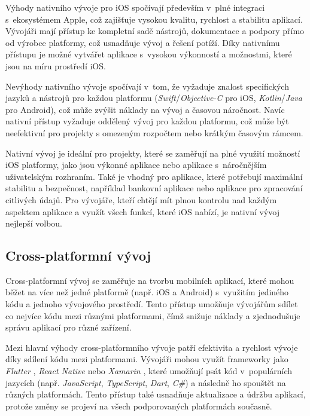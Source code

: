 Výhody nativního vývoje pro iOS spočívají především v~plné integraci s~ekosystémem Apple, což zajišťuje vysokou kvalitu, rychlost a stabilitu aplikací. Vývojáři mají přístup ke kompletní sadě nástrojů, dokumentace a podpory přímo od výrobce platformy, což usnadňuje vývoj a řešení potíží. Díky nativnímu přístupu je možné vytvářet aplikace s~vysokou výkonností a možnostmi, které jsou na míru prostředí iOS.

Nevýhody nativního vývoje spočívají v~tom, že vyžaduje znalost specifických jazyků a nástrojů pro každou platformu (\emph{Swift}/\emph{Objective-C} pro iOS, \emph{Kotlin}/\emph{Java} pro Android), což může zvýšit náklady na vývoj a časovou náročnost. Navíc nativní přístup vyžaduje oddělený vývoj pro každou platformu, což může být neefektivní pro projekty s omezeným rozpočtem nebo krátkým časovým rámcem.

Nativní vývoj je ideální pro projekty, které se zaměřují na plné využití možností iOS platformy, jako jsou výkonné aplikace nebo aplikace s~náročnějším uživatelským rozhraním. Také je vhodný pro aplikace, které potřebují maximální stabilitu a bezpečnost, například bankovní aplikace nebo aplikace pro zpracování citlivých údajů. Pro vývojáře, kteří chtějí mít plnou kontrolu nad každým aspektem aplikace a využít všech funkcí, které iOS nabízí, je nativní vývoj nejlepší volbou.

\subsection{Cross-platformní vývoj}

Cross-platformní vývoj se zaměřuje na tvorbu mobilních aplikací, které mohou běžet na více než jedné platformě (např. iOS a Android) s~využitím jediného kódu a jednoho vývojového prostředí. Tento přístup umožňuje vývojářům sdílet co nejvíce kódu mezi různými platformami, čímž snižuje náklady a zjednodušuje správu aplikací pro různé zařízení.

Mezi hlavní výhody cross-platformního vývoje patří efektivita a rychlost vývoje díky sdílení kódu mezi platformami. Vývojáři mohou využít frameworky jako \emph{Flutter} \cite{flutter-cross-platform}, \emph{React Native} \cite{react-native-cross-platform} nebo \emph{Xamarin} \cite{xamarin-cross-platform}, které umožňují psát kód v~populárních jazycích (např. \emph{JavaScript}, \emph{TypeScript}, \emph{Dart}, \emph{C\#}) a následně ho spouštět na různých platformách. Tento přístup také usnadňuje aktualizace a údržbu aplikací, protože změny se projeví na všech podporovaných platformách současně.

